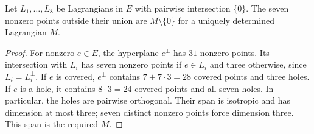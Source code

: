 \begin{lemma}\label{lem:eight-completion}
Let $L_1,\ldots,L_8$ be Lagrangians in $E$ with pairwise
intersection $\{0\}$. The seven nonzero points outside their union
are $M\setminus\{0\}$ for a uniquely determined Lagrangian $M$.
\end{lemma}
\begin{proof}
For nonzero $e\in E$, the hyperplane $e^\perp$ has $31$ nonzero
points. Its intersection with $L_i$ has seven nonzero points if
$e\in L_i$ and three otherwise, since $L_i=L_i^\perp$.
If $e$ is covered, $e^\perp$ contains $7+7\cdot3=28$ covered
points and three holes. If $e$ is a hole, it contains
$8\cdot3=24$ covered points and all seven holes. In particular,
the holes are pairwise orthogonal. Their span is isotropic and
has dimension at most three; seven distinct nonzero points force
dimension three. This span is the required $M$.
\end{proof}

